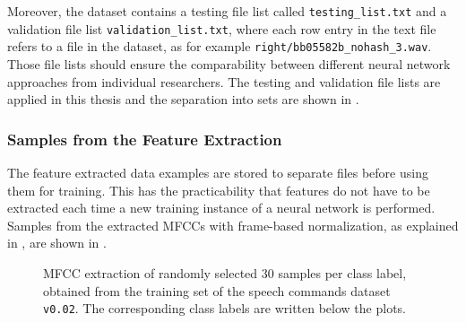 Moreover, the dataset contains a testing file list called \texttt{testing\_list.txt} and a validation file list \texttt{validation\_list.txt}, where each row entry in the text file refers to a file in the dataset, as for example \texttt{right/bb05582b\_nohash\_3.wav}.
Those file lists should ensure the comparability between different neural network approaches from individual researchers.
The testing and validation file lists are applied in this thesis and the separation into sets are shown in .



\subsubsection{Samples from the Feature Extraction}
The feature extracted data examples are stored to separate files before using them for training.
This has the practicability that features do not have to be extracted each time a new training instance of a neural network is performed.
Samples from the extracted MFCCs with frame-based normalization, as explained in , are shown in .
\begin{figure}[!ht]
  \centering
  \caption{MFCC extraction of randomly selected 30 samples per class label, obtained from the training set of the speech commands dataset \texttt{v0.02}. The corresponding class labels are written below the plots.}
  \label{fig:exp_dataset_speech_cmd_mfcc}
\end{figure}
